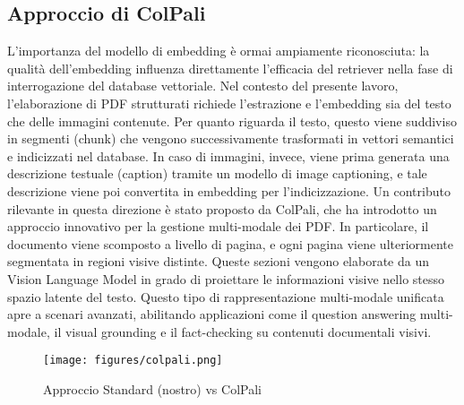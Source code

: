 \subsection{Approccio di ColPali}
L’importanza del modello di embedding è ormai ampiamente riconosciuta: la qualità dell'embedding influenza direttamente l’efficacia del retriever nella fase di interrogazione del database vettoriale. Nel contesto del presente lavoro, l’elaborazione di PDF strutturati richiede l’estrazione e l’embedding sia del testo che delle immagini contenute.
Per quanto riguarda il testo, questo viene suddiviso in segmenti (chunk) che vengono successivamente trasformati in vettori semantici e indicizzati nel database. In caso di immagini, invece, viene prima generata una descrizione testuale (caption) tramite un modello di image captioning, e tale descrizione viene poi convertita in embedding per l’indicizzazione.
Un contributo rilevante in questa direzione è stato proposto da ColPali, che ha introdotto un approccio innovativo per la gestione multi-modale dei PDF. In particolare, il documento viene scomposto a livello di pagina, e ogni pagina viene ulteriormente segmentata in regioni visive distinte. Queste sezioni vengono elaborate da un Vision Language Model in grado di proiettare le informazioni visive nello stesso spazio latente del testo.
Questo tipo di rappresentazione multi-modale unificata apre a scenari avanzati, abilitando applicazioni come il question answering multi-modale, il visual grounding e il fact-checking su contenuti documentali visivi.

\begin{figure}[!ht]
\centering
\texttt{[image: figures/colpali.png]}
\caption{Approccio Standard (nostro) vs ColPali}
\end{figure}


